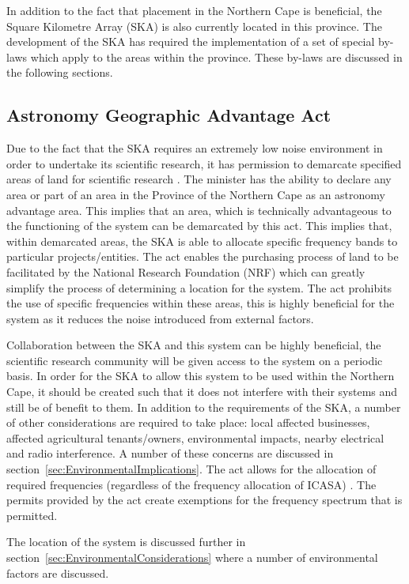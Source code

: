 \documentclass[11pt]{witseiepaper}
\begin{document}
\begin{bibunit}[witseie]
In addition to the fact that placement in the Northern Cape is beneficial, the Square Kilometre Array (SKA) is also currently located in this province. The development of the SKA has required the implementation of a set of special by-laws which apply to the areas within the province. These by-laws are discussed in the following sections.


\subsection{Astronomy Geographic Advantage Act} \label{sec:AstronomyGeographicAdvantageAct}
Due to the fact that the SKA requires an extremely low noise environment in order to undertake its scientific research, it has permission to demarcate specified areas of land for scientific research \cite{SKAActDescription}. 
The minister has the ability to declare any area or part of an area in the Province of the Northern Cape as an astronomy advantage area. This implies that an area, which is technically advantageous to the functioning of the system can be demarcated by this act. This implies that, within demarcated areas, the SKA is able to allocate specific frequency bands to particular projects/entities. 
The act enables the purchasing process of land to be facilitated by the National Research Foundation (NRF) which can greatly simplify the process of determining a location for the system. The act prohibits the use of specific frequencies within these areas, this is highly beneficial for the system as it reduces the noise introduced from external factors.

Collaboration between the SKA and this system can be highly beneficial, the scientific research community will be given access to the system on a periodic basis. In order for the SKA to allow this system to be used within the Northern Cape, it should be created such that it does not interfere with their systems and still be of benefit to them. In addition to the requirements of the SKA, a number of other considerations are required to take place: local affected businesses, affected agricultural tenants/owners, environmental impacts, nearby electrical and radio interference. A number of these concerns are discussed in section~\ref{sec:EnvironmentalImplications}.
The act allows for the allocation of required frequencies (regardless of the frequency allocation of ICASA) \cite{SKAAct}. The permits provided by the act create exemptions for the frequency spectrum that is permitted.

The location of the system is discussed further in section~\ref{sec:EnvironmentalConsiderations} where a number of environmental factors are discussed.


\end{bibunit}
\end{document}
